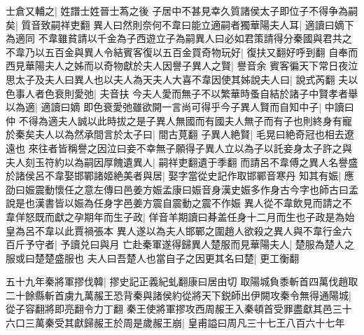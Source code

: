士倉又輔之|{
	姓譜士姓晉士蒍之後}
子居中不甚見幸久質諸侯太子即位子不得争為嗣矣|{
	質音致嗣祥吏翻}
異人曰然則奈何不韋曰能立適嗣者獨華陽夫人耳|{
	適讀曰嫡下為適同}
不韋雖貧請以千金為子西遊立子為嗣異人曰必如君策請得分秦國與君共之不韋乃以五百金與異人令結賓客復以五百金買奇物玩好|{
	復扶又翻好呼到翻}
自奉而西見華陽夫人之姊而以奇物獻於夫人因譽子異人之賢|{
	譽音余}
賓客徧天下常日夜泣思太子及夫人曰異人也以夫人為天夫人大喜不韋因使其姊說夫人曰|{
	說式芮翻}
夫以色事人者色衰則愛弛|{
	夫音扶}
今夫人愛而無子不以繁華時蚤自結於諸子中賢孝者舉以為適|{
	適讀曰嫡}
即色衰愛弛雖欲開一言尚可得乎今子異人賢而自知中子|{
	中讀曰仲}
不得為適夫人誠以此時拔之是子異人無國而有國夫人無子而有子也則終身有寵於秦矣夫人以為然承間言於太子曰|{
	間古莧翻}
子異人絶賢|{
	毛晃曰絶奇冠也相去遼遠也}
來往者皆稱譽之因泣曰妾不幸無子願得子異人立以為子以託妾身太子許之與夫人刻玉符約以為嗣因厚餽遺異人|{
	嗣祥吏翻遺于季翻}
而請呂不韋傅之異人名譽盛於諸侯呂不韋娶邯鄲諸姬絶美者與居|{
	娶字當從史記作取邯鄲音寒丹}
知其有娠|{
	應劭曰娠震動懷任之意左傳曰邑姜方娠孟康曰娠音身漢史娠多作身古今字也師古曰孟說是也漢書皆以娠為任身字邑姜方震自震動之震不作娠}
異人從不韋飲見而請之不韋佯怒既而獻之孕期年而生子政|{
	佯音羊期讀曰朞盖任身十二月而生也子政是為始皇為呂不韋以此賈禍張本}
異人遂以為夫人邯鄲之圍趙人欲殺之異人與不韋行金六百斤予守者|{
	予讀兑曰與月}
亡赴秦軍遂得歸異人楚服而見華陽夫人|{
	楚服為楚人之服或曰楚楚盛服也}
夫人曰吾楚人也當自子之因更其名曰楚|{
	更工衡翻}


五十九年秦將軍摎伐韓|{
	摎史記正義紀虬翻康曰居由切}
取陽城負黍斬首四萬伐趙取二十餘縣斬首虜九萬赧王恐背秦與諸侯約從將天下鋭師出伊闕攻秦令無得通陽城|{
	從子容翻將即亮翻令力丁翻}
秦王使將軍摎攻西周赧王入秦頓首受罪盡獻其邑三十六口三萬秦受其獻歸赧王於周是歲赧王崩|{
	皇甫謚曰周凡三十七王八百六十七年}


